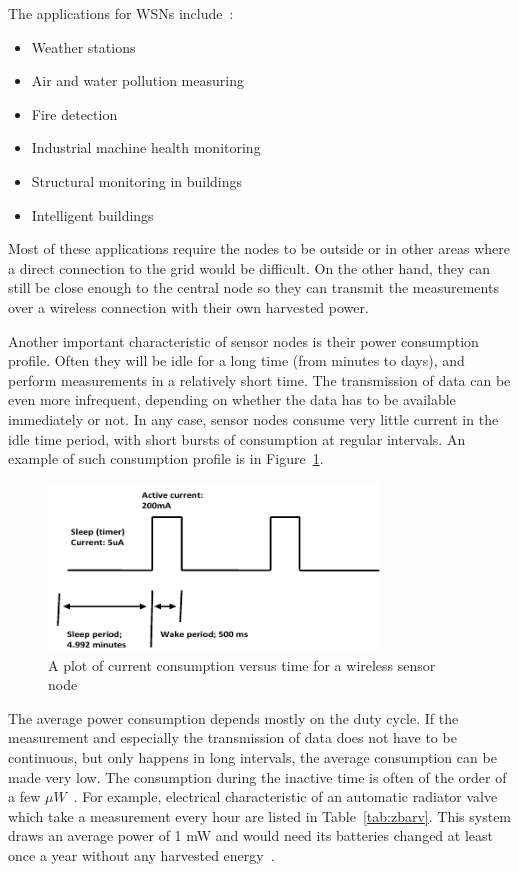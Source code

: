 \documentclass[a4paper,10pt]{article}
\begin{document}
The applications for \acp{WSN} include~\cite{wiki:eh}:
\begin{itemize}
  \item Weather stations
  \item Air and water pollution measuring
  \item Fire detection
  \item Industrial machine health monitoring
  \item Structural monitoring in buildings
  \item Intelligent buildings~\cite{cap-wsn-ieee}
\end{itemize}

Most of these applications require the nodes to be outside or in other areas where a direct connection to the grid would be difficult. On the other hand, they can still be close enough to the central node so they can transmit the measurements over a wireless connection with their own harvested power. 

Another important characteristic of sensor nodes is their power consumption profile. Often they will be idle for a long time (from minutes to days), and perform measurements in a relatively short time. The transmission of data can be even more infrequent, depending on whether the data has to be available immediately or not. In any case, sensor nodes consume very little current in the idle time period, with short bursts of consumption at regular intervals. An example of such consumption profile is in Figure~\ref{fig:wsn-consumption}. 

\begin{figure}[h]
\centering
 \includegraphics[width=250pt]{./Slike/wsn-current-profile}
 \caption{A plot of current consumption versus time for a wireless sensor node~\cite{cap-wsn-ieee}}
\label{fig:wsn-consumption}
\end{figure}

The average power consumption depends mostly on the duty cycle. If the measurement and especially the transmission of data  does not have to be continuous, but only happens in long intervals, the average consumption can be made very low. The consumption during the inactive time is often of the order of a few $\mu W$~\cite{Salerno10}. For example, electrical characteristic of an automatic radiator valve which take a measurement every hour are listed in Table~\ref{tab:zbarv}. This system draws an average power of 1 mW and would need its batteries changed at least once a year without any harvested energy~\cite{teg-wsn-ieee}. 
\end{document}
